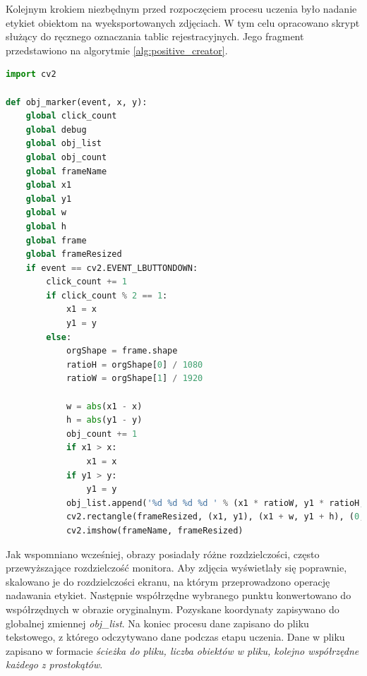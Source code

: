 Kolejnym krokiem niezbędnym przed rozpoczęciem procesu uczenia było nadanie etykiet obiektom na wyeksportowanych zdjęciach.
W tym celu opracowano skrypt służący do ręcznego oznaczania tablic rejestracyjnych.
Jego fragment przedstawiono na algorytmie \ref{alg:positive_creator}.
\begin{lstlisting}[language=Python, caption=Funkcja do oznaczania fragmentów obrazu zawierających poszukiwany obiekt, label=alg:positive_creator]
import cv2

def obj_marker(event, x, y):
    global click_count
    global debug
    global obj_list
    global obj_count
    global frameName
    global x1
    global y1
    global w
    global h
    global frame
    global frameResized
    if event == cv2.EVENT_LBUTTONDOWN:
        click_count += 1
        if click_count % 2 == 1:
            x1 = x
            y1 = y
        else:
            orgShape = frame.shape
            ratioH = orgShape[0] / 1080
            ratioW = orgShape[1] / 1920

            w = abs(x1 - x)
            h = abs(y1 - y)
            obj_count += 1
            if x1 > x:
                x1 = x
            if y1 > y:
                y1 = y
            obj_list.append('%d %d %d %d ' % (x1 * ratioW, y1 * ratioH, w * ratioW, h * ratioH))
            cv2.rectangle(frameResized, (x1, y1), (x1 + w, y1 + h), (0, 255, 0), 1)
            cv2.imshow(frameName, frameResized)
\end{lstlisting}
Jak wspomniano wcześniej, obrazy posiadały różne rozdzielczości, często przewyższające rozdzielczość monitora.
Aby zdjęcia wyświetlały się poprawnie, skalowano je do rozdzielczości ekranu, na którym przeprowadzono operację nadawania etykiet.
Następnie współrzędne wybranego punktu konwertowano do współrzędnych w obrazie oryginalnym.
Pozyskane koordynaty zapisywano do globalnej zmiennej \textit{obj\_list}.
Na koniec procesu dane zapisano do pliku tekstowego, z którego odczytywano dane podczas etapu uczenia.
Dane w pliku zapisano w formacie \textit{ścieżka do pliku, liczba obiektów w pliku, kolejno współrzędne każdego z prostokątów}.

